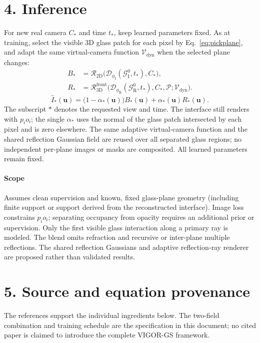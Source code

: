 \documentclass[10pt,a4paper]{article}
\newcommand{\GI}{\mathcal G_{\mathrm I}}
\newcommand{\GR}{\mathcal G_{\mathrm R}}
\newcommand{\RI}{\mathcal R_{\mathrm{2D}}}
\newcommand{\RRf}{\mathcal R_{\mathrm{3D}}^{\mathrm{front}}}
\newcommand{\Vf}{\mathcal V_{\mathrm{dyn}}}
\newcommand{\Def}{\mathcal D}
\newcommand{\uu}{\mathbf u}
\begin{document}
\section*{4. Inference}
For new real camera $C_*$ and time $t_*$, keep learned parameters fixed.
As at training, select the visible 3D glass patch for each pixel by
Eq.~\eqref{eq:pickplane}, and adapt the same virtual-camera function
$\Vf$ when the selected plane changes:
\begin{equation}
\boxed{\begin{aligned}
B_*&=\RI\bigl(\Def_{\phi_{\mathrm I}}(\GI^0,t_*),C_*\bigr),\\[-1pt]
R_*&=\RRf\bigl(\Def_{\phi_{\mathrm R}}(\GR^0,t_*),
C_*,\mathcal P;\Vf\bigr).
\end{aligned}}\tag{12}
\end{equation}
\begin{equation}
\boxed{\hat I_*(\uu)=
\bigl(1-\alpha_*(\uu)\bigr)B_*(\uu)
+\alpha_*(\uu)R_*(\uu).}\tag{13}
\end{equation}
The subscript $*$ denotes the requested view and time. The interface
still renders with $p_i o_i$; the single $\alpha_*$ uses the normal
of the glass patch intersected by each pixel and is zero elsewhere.
The same adaptive virtual-camera function and the shared reflection
Gaussian field are reused over all separated glass regions; no independent
per-plane images or masks are composited. All learned parameters remain fixed.

\paragraph*{Scope}
Assumes clean supervision and known, fixed glass-plane geometry (including
finite support or support derived from the reconstructed interface). Image
loss constrains $p_i o_i$; separating occupancy from opacity requires an
additional prior or supervision. Only the first visible glass interaction
along a primary ray is modeled. The blend omits refraction and recursive
or inter-plane multiple reflections. The shared reflection Gaussians and
adaptive reflection-ray renderer are proposed rather than validated results.
\newpage
\section*{5. Source and equation provenance}
The references support the individual ingredients below. The two-field combination and training schedule are the specification in this document; no cited paper is claimed to introduce the complete VIGOR-GS framework.
\end{document}
